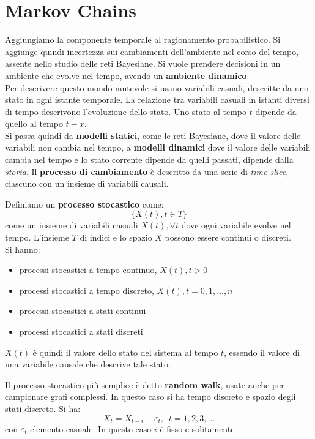 \message{ !name(modprob.tex)}\documentclass[a4paper,12pt, oneside]{book}
\begin{document}
\chapter{Markov Chains}
Aggiungiamo la componente temporale al ragionamento probabilistico. Si aggiunge
quindi incertezza sui cambiamenti dell'ambiente nel corso del tempo, assente
nello studio delle reti Bayesiane. Si vuole prendere decisioni in un ambiente
che evolve nel tempo, avendo un \textbf{ambiente dinamico}.\\
Per descrivere questo mondo mutevole si usano variabili casuali, descritte da
uno stato in ogni istante temporale. La relazione tra variabili casuali in
istanti diversi di tempo descrivono l'evoluzione dello stato. Uno stato al tempo
$t$ dipende da quello al tempo $t-x$.\\
Si passa quindi da \textbf{modelli statici}, come le reti Bayesiane, dove il
valore delle variabili non cambia nel tempo, a \textbf{modelli dinamici} dove il
valore delle variabili cambia nel tempo e lo stato corrente dipende da quelli
passati, dipende dalla \textit{storia}. Il \textbf{processo di cambiamento} è
descritto da una serie di \textit{time slice}, ciascuno con un insieme di
variabili causali.
\begin{definizione}
  Definiamo un \textbf{processo stocastico} come:
  \[\{X(t), t\in T\}\]
  come un insieme di variabili casuali $X(t),\forall t$ dove ogni variabile
  evolve nel tempo. L'insieme $T$ di indici e lo spazio $X$ possono essere
  continui o discreti.\\
  Si hanno:
  \begin{itemize}
    \item processi stocastici a tempo continuo, $X(t),t>0$
    \item processi stocastici a tempo discreto, $X(t), t=0,1,\ldots,n$
    \item processi stocastici a stati continui
    \item processi stocastici a stati discreti
  \end{itemize}
  $X(t)$ è quindi il valore dello stato del sistema al tempo $t$, essendo il
  valore di una variabile causale che descrive tale stato.
\end{definizione}
Il processo stocastico più semplice è detto \textbf{random walk}, usate anche
per campionare grafi complessi. In questo caso si ha tempo discreto e spazio
degli stati discreto. Si ha:
\[X_t=X_{t-i}+\varepsilon_t,\,\,\,t=1,2,3,\ldots\]
con $\varepsilon_t$ elemento casuale. In questo caso $i$ è fisso e solitamente
\end{document}
